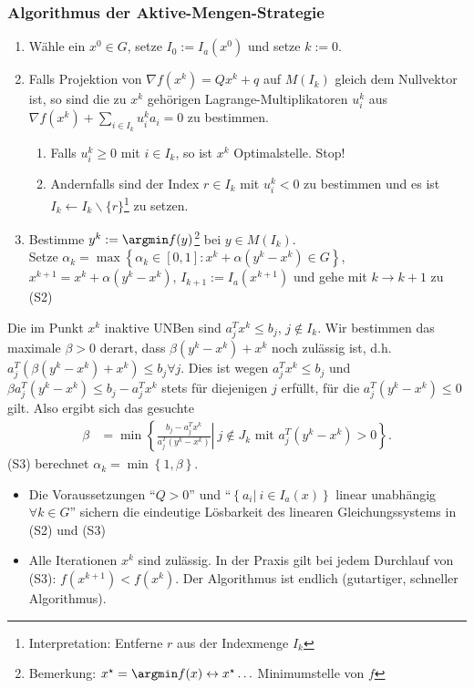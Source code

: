 \subsubsection{Algorithmus der Aktive-Mengen-Strategie}
\begin{enumerate}[label=(S\arabic*)]
  \item Wähle ein $x^0\in G$, setze $I_0:=I_a(x^0)$ und setze $k:=0$.
  \item Falls Projektion von $\nabla f(x^k)=Qx^k+q$ auf $M(I_k)$ gleich dem Nullvektor ist, so sind die zu $x^k$ gehörigen Lagrange-Multiplikatoren
  $u_i^k$ aus $\nabla f(x^k)+\sum\limits_{i\in I_k}u_i^ka_i=0$ zu bestimmen.
  \begin{enumerate}[label=(S2\alph*)]
    \item Falls $u_i^k\ge 0$ mit $i\in I_k$, so ist $x^k$ Optimalstelle. Stop!
    \item Andernfalls sind der Index $r\in I_k$ mit $u_i^k<0$ zu bestimmen und es ist $I_k\leftarrow I_k\backslash\{r\}$\footnote{Interpretation: Entferne $r$ aus der Indexmenge $I_k$}
    zu setzen.
  \end{enumerate}
  \item Bestimme $y^k:=\argmin f(y)$\footnote{Bemerkung: $x^{\star}=\argmin f(x) \leftrightarrow x^{\star}\ldots$ Minimumstelle von $f$} bei $y\in
  M(I_k)$.\\
  		Setze $\alpha_k=\max\left\{\alpha_k\in[0,1]:x^k+\alpha(y^k-x^k)\in G\right\}$, $x^{k+1}=x^k+\alpha(y^k-x^k)$, $I_{k+1}:=I_a(x^{k+1})$ und gehe mit
  		$k\rightarrow k+1$ zu (S2)
\end{enumerate}
\begin{remark}[zu (S3)]
  Die im Punkt $x^k$ inaktive UNBen sind $a_j^Tx^k\le b_j$, $j\notin I_k$.
  Wir bestimmen das maximale $\beta > 0$ derart, dass $\beta(y^k-x^k)+x^k$ noch zulässig ist, d.h. $a_j^T(\beta(y^k-x^k)+x^k)\le b_j \forall j$.
  Dies ist wegen $a_j^Tx^k\le b_j$ und $\beta a_j^T(y^k-x^k)\le b_j-a_j^Tx^k$ stets für diejenigen $j$ erfüllt, für die $a_j^T(y^k-x^k)\le 0$ gilt. 
  Also ergibt sich das gesuchte \begin{align*}
  \beta & = \min\left\{\left.\frac{b_j-a_j^Tx^k}{a_j^T(y^k-x^k)}\right|\ j\notin J_k\text{ mit } a_j^T(y^k-x^k)>0 \right\}.
  \end{align*}
  (S3) berechnet $\alpha_k=\min\left\{1,\beta\right\}$.
\end{remark}
\begin{remark}\hspace{1mm}
\begin{itemize}
  \item Die Voraussetzungen ``$Q>0$'' und ``$\left\{a_i|\ i\in I_a(x)\right\}$ linear unabhängig $\forall k\in G$'' sichern die eindeutige Lösbarkeit des linearen Gleichungssystems in
  (S2) und (S3)
  \item Alle Iterationen $x^k$ sind zulässig. In der Praxis gilt bei jedem Durchlauf von (S3): $f(x^{k+1})<f(x^k)$. Der Algorithmus ist endlich (gutartiger, schneller Algorithmus).
\end{itemize}
\end{remark}
